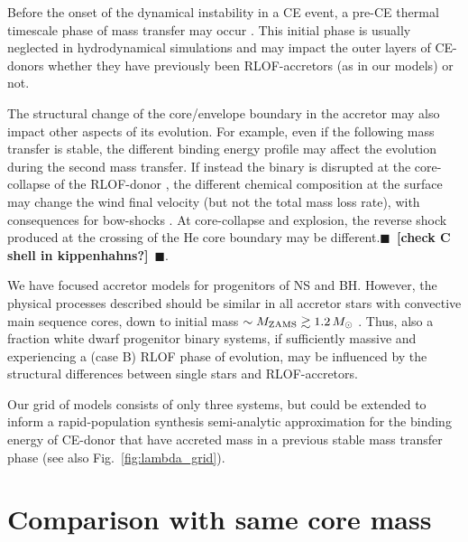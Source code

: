 \documentclass[twocolumn,twocolappendix,trackchanges]{aastex63}
\DeclareRobustCommand{\Figref}[1]{Fig.~\ref{#1}}
\newcommand{\todo}[1]{{\large $\blacksquare$~\textbf{\color{red}[#1]}}~$\blacksquare$}
\begin{document}
Before the onset of the
dynamical instability in a CE event, a pre-CE thermal timescale phase
of mass transfer may occur \citep[e.g.,][]{pejcha:17,
  blagorodnova:2021}. This initial phase is usually neglected in
hydrodynamical simulations and may impact the outer layers of
CE-donors whether they have previously been RLOF-accretors (as in our
models) or not.

The structural change of the core/envelope boundary in the accretor
may also impact other aspects of its evolution. For example, even if
the following mass transfer is stable, the different binding energy
profile may affect the evolution during the second mass transfer. If
instead the binary is disrupted at the core-collapse of the RLOF-donor
\citep[e.g.,][]{blaauw:1961, renzo:2019walk}, the different chemical
composition at the surface \citep[e.g.,][]{blaauw:93, renzo:2021zoph}
may change the wind final velocity (but not the total mass loss rate),
with consequences for bow-shocks \citep[e.g.,][]{bodensteiner:18,
  moutzouri:22}. At core-collapse and explosion, the reverse shock
produced at the crossing of the He core boundary may be
different.\todo{check C shell in kippenhahns?}.

We have focused accretor models for progenitors of NS and BH. However,
the physical processes described should be similar in all accretor
stars with convective main sequence cores, down to initial mass
$\sim{}M_{\rm ZAMS}\gtrsim 1.2\,M_\odot$ \citep[see also][]{wang:20}.
Thus, also a fraction white dwarf progenitor binary systems, if
sufficiently massive and experiencing a (case B) RLOF phase of
evolution, may be influenced by the structural differences between
single stars and RLOF-accretors.

Our grid of models consists of only three systems, but could be
extended to inform a rapid-population synthesis semi-analytic
approximation for the binding energy of CE-donor that have accreted
mass in a previous stable mass transfer phase (see also \Figref{fig:lambda_grid}).



\appendix

\section{Comparison with same core mass}
\end{document}
